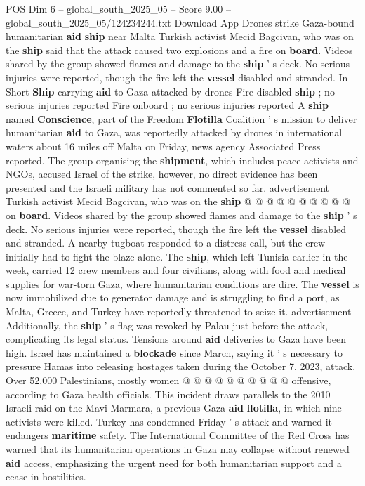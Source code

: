 \begin{textsample}{POS Dim 6 – global\_south\_2025\_05 – Score 9.00 – global\_south\_2025\_05/124234244.txt}  \label{ex:f6_pos_054}
Download App Drones strike Gaza-bound humanitarian \textbf{aid} \textbf{ship} near Malta Turkish activist Mecid Bagcivan, who was on the \textbf{ship} said that the attack caused two explosions and a fire on \textbf{board}.
Videos shared by the group showed flames and damage to the \textbf{ship} ' s deck.
No serious injuries were reported, though the fire left the \textbf{vessel} disabled and stranded.
In Short \textbf{Ship} carrying \textbf{aid} to Gaza attacked by drones Fire disabled \textbf{ship} ; no serious injuries reported Fire onboard ; no serious injuries reported A \textbf{ship} named \textbf{Conscience}, part of the Freedom \textbf{Flotilla} Coalition ' s mission to deliver humanitarian \textbf{aid} to Gaza, was reportedly attacked by drones in international waters about 16 miles off Malta on Friday, news agency Associated Press reported.
The group organising the \textbf{shipment}, which includes peace activists and NGOs, accused Israel of the strike, however, no direct evidence has been presented and the Israeli military has not commented so far. advertisement Turkish activist Mecid Bagcivan, who was on the \textbf{ship} @ @ @ @ @ @ @ @ @ @ on \textbf{board}.
Videos shared by the group showed flames and damage to the \textbf{ship} ' s deck.
No serious injuries were reported, though the fire left the \textbf{vessel} disabled and stranded.
A nearby tugboat responded to a distress call, but the crew initially had to fight the blaze alone.
The \textbf{ship}, which left Tunisia earlier in the week, carried 12 crew members and four civilians, along with food and medical supplies for war-torn Gaza, where humanitarian conditions are dire.
The \textbf{vessel} is now immobilized due to generator damage and is struggling to find a port, as Malta, Greece, and Turkey have reportedly threatened to seize it. advertisement Additionally, the \textbf{ship} ' s flag was revoked by Palau just before the attack, complicating its legal status.
Tensions around \textbf{aid} deliveries to Gaza have been high.
Israel has maintained a \textbf{blockade} since March, saying it ' s necessary to pressure Hamas into releasing hostages taken during the October 7, 2023, attack.
Over 52,000 Palestinians, mostly women @ @ @ @ @ @ @ @ @ @ offensive, according to Gaza health officials.
This incident draws parallels to the 2010 Israeli raid on the Mavi Marmara, a previous Gaza \textbf{aid} \textbf{flotilla}, in which nine activists were killed.
Turkey has condemned Friday ' s attack and warned it endangers \textbf{maritime} safety.
The International Committee of the Red Cross has warned that its humanitarian operations in Gaza may collapse without renewed \textbf{aid} access, emphasizing the urgent need for both humanitarian support and a cease in hostilities.

\end{textsample}
